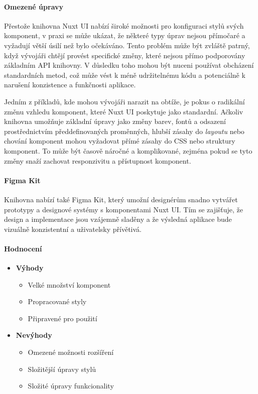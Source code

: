 \paragraph{Omezené úpravy}
Přestože knihovna Nuxt UI nabízí široké možnosti pro konfiguraci stylů svých komponent, v praxi se může ukázat, že některé typy úprav nejsou přímočaré a vyžadují větší úsilí než bylo očekáváno. Tento problém může být zvláště patrný, když vývojáři chtějí provést specifické změny, které nejsou přímo podporovány základním API knihovny. V důsledku toho mohou být nuceni používat obcházení standardních metod, což může vést k méně udržitelnému kódu a potenciálně k narušení konzistence a funkčnosti aplikace.

Jedním z příkladů, kde mohou vývojáři narazit na obtíže, je pokus o radikální změnu vzhledu komponent, které Nuxt UI poskytuje jako standardní. Ačkoliv knihovna umožňuje základní úpravy jako změny barev, fontů a odsazení prostřednictvím předdefinovaných proměnných, hlubší zásahy do \emph{layoutu} nebo chování komponent mohou vyžadovat přímé zásahy do CSS nebo struktury komponent. To může být časově náročné a komplikované, zejména pokud se tyto změny snaží zachovat responzivitu a přístupnost komponent.

\paragraph{Figma Kit}

Knihovna nabízí také Figma Kit, který umožní designérům snadno vytvářet prototypy a designové systémy s komponentami Nuxt UI. Tím se zajišťuje, že design a implementace jsou vzájemně sladěny a že výsledná aplikace bude vizuálně konzistentní a uživatelsky přívětivá. \cite{NuxtUIFigma}

\paragraph{Hodnocení}

\begin{itemize}
    \item \textbf{Výhody}
    \begin{itemize}
        \item Velké množství komponent
        \item Propracované styly
        \item Připravené pro použití
    \end{itemize}
    \item \textbf{Nevýhody}
    \begin{itemize}
        \item Omezené možnosti rozšíření
        \item Složitější úpravy stylů
        \item Složité úpravy funkcionality
    \end{itemize}
\end{itemize}

